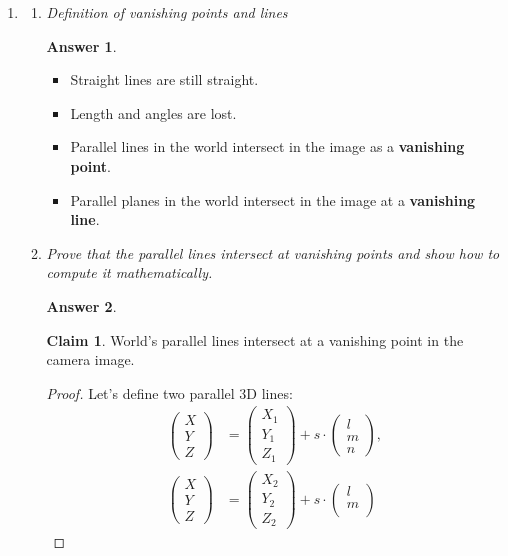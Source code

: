 \documentclass[a4paper,12 pt]{article}
\theoremstyle{definition}
\theoremstyle{remark}
\theoremstyle{definition}
\theoremstyle{definition}
\theoremstyle{definition}
\theoremstyle{definition}
\newtheorem{claim}{Claim}
\theoremstyle{remark}
\theoremstyle{remark}
\theoremstyle{definition}
\theoremstyle{definition}
\newtheorem*{answer}{Answer}
\begin{document}
\begin{enumerate}
\item \begin{enumerate}
\item \textit{Definition of vanishing points and lines}
\begin{answer}
\
\begin{itemize}
\item Straight lines are still straight.
\item Length and angles are lost.
\item Parallel lines in the world intersect in the image as a \textbf{vanishing point}.
\item Parallel planes in the world intersect in the image at a \textbf{vanishing line}. 
\end{itemize}
\end{answer}
\item \textit{Prove that the parallel lines intersect at vanishing points and show how to compute it mathematically.}
\begin{answer}
\begin{claim}
World's parallel lines intersect at a vanishing point in the camera image.
\end{claim}
\begin{proof}
Let's define two parallel 3D lines:
\begin{equation}
\begin{split}
\begin{pmatrix}
X\\
Y\\
Z
\end{pmatrix}&=\begin{pmatrix}
X_1\\
Y_1\\
Z_1
\end{pmatrix}+s\cdot \begin{pmatrix}
l\\
m\\
n
\end{pmatrix},\\
\begin{pmatrix}
X\\
Y\\
Z
\end{pmatrix}&=\begin{pmatrix}
X_2\\
Y_2\\
Z_2
\end{pmatrix}+s\cdot \begin{pmatrix}
l\\
m\\

\end{pmatrix}
\end{split}
\end{equation}
\end{proof}
\end{answer}
\end{enumerate}
\end{enumerate}
\end{document}
